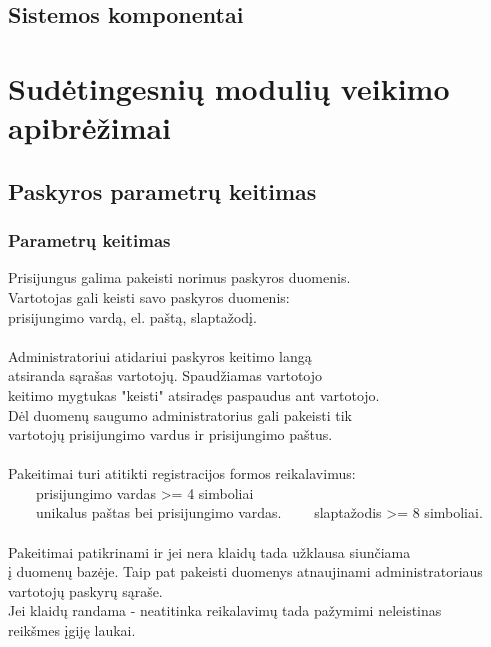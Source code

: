 \documentclass[a4paper,12pt]{article}
\newcommand{\tabitem}{~~\llap{\textbullet}~~}
\begin{document}
\subsection{Sistemos komponentai}


\section{Sudėtingesnių modulių veikimo apibrėžimai}

\subsection{ Paskyros parametrų keitimas }

\subsubsection{Parametrų keitimas}
Prisijungus galima pakeisti norimus paskyros duomenis.\\
Vartotojas gali keisti savo paskyros duomenis: \\
	prisijungimo vardą, el. paštą, slaptažodį. \\\\
	
Administratoriui atidariui paskyros keitimo langą\\
atsiranda sąrašas vartotojų. Spaudžiamas vartotojo \\
keitimo mygtukas "keisti" atsiradęs paspaudus ant vartotojo.\\
Dėl duomenų saugumo administratorius gali pakeisti tik\\
vartotojų prisijungimo vardus ir prisijungimo paštus. \\\\

Pakeitimai turi atitikti registracijos formos reikalavimus: \\
	\tabitem prisijungimo vardas >= 4 simboliai\\
	\tabitem unikalus paštas bei prisijungimo vardas.
    \tabitem slaptažodis >= 8 simboliai. \\\\
    
Pakeitimai patikrinami ir jei nera klaidų tada užklausa siunčiama \\
į duomenų bazėje. Taip pat pakeisti duomenys atnaujinami administratoriaus \\
vartotojų paskyrų sąraše. \\
Jei klaidų randama - neatitinka reikalavimų tada pažymimi neleistinas \\
reikšmes įgiję laukai.\\
\end{document}
